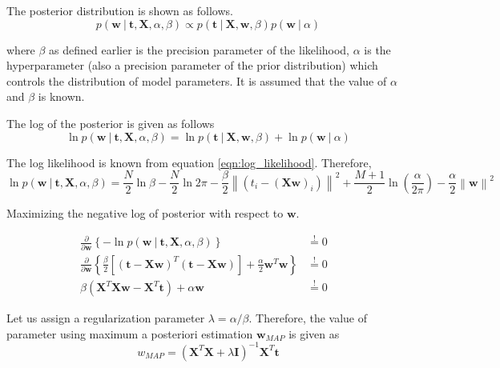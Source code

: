 \documentclass[11pt]{article}
\newcommand\given[1][]{\:#1\vert\:}
\newcommand{\norm}[1]{\left\lVert#1\right\rVert}
\begin{document}
The posterior distribution is shown as follows.
\begin{equation}
    p(\bm{w} \given \bm{t}, \bm{X}, \alpha, \beta) \propto p(\bm{t} \given \bm{X}, \bm{w}, \beta) p(\bm{w} \given \alpha)
\end{equation}

where $\beta$ as defined earlier is the precision parameter of the likelihood, $\alpha$ is the hyperparameter (also a precision parameter of the prior distribution) which controls the distribution of model parameters. It is assumed that the value of $\alpha$ and $\beta$ is known.

The log of the posterior is given as follows
\begin{equation}
    \ln{p(\bm{w} \given \bm{t}, \bm{X}, \alpha, \beta)} = 
    \ln{p(\bm{t} \given \bm{X}, \bm{w}, \beta)} + \ln{p(\bm{w} \given \alpha)}
\end{equation}

The log likelihood is known from equation \ref{eqn:log_likelihood}. Therefore, 
\begin{equation} \label{eqn:log_posterior}
    \ln{p(\bm{w} \given \bm{t}, \bm{X}, \alpha, \beta)} = \frac{N}{2}\ln{\beta} - \frac{N}{2}\ln{2\pi} - \frac{\beta}{2} \norm{\left(t_i - (\bm{X}\bm{w})_i\right)}^2 + \frac{M+1}{2} \ln{\left( \frac{\alpha}{2\pi} \right)} - \frac{\alpha}{2}\norm{\bm{w}}^2
\end{equation}

\newpage
Maximizing the negative log of posterior with respect to $\bm{w}$.

\begin{eqnarray}
    \frac{\partial }{\partial  \bm{w}} \left\{ -\ln{p(\bm{w} \given \bm{t}, \bm{X}, \alpha, \beta)} \right\} 
    &\overset{!}{=} 0& \\
    \frac{\partial }{\partial \bm{w}} \left\{\frac{\beta}{2} \left[ \left(\bm{t} - \bm{X}\bm{w}\right)^T \left(\bm{t} - \bm{X}\bm{w}\right)\right] + \frac{\alpha}{2}\bm{w}^T\bm{w}\right\}
    &\overset{!}{=} 0& \\
    \beta \left( \bm{X}^T\bm{X}\bm{w} - \bm{X}^T \bm{t} \right) + \alpha\bm{w}
    &\overset{!}{=} 0& 
\end{eqnarray}

Let us assign a regularization parameter $\lambda = \alpha/\beta$. Therefore, the value of parameter using maximum a posteriori estimation $\bm{w}_{MAP}$ is given as
\begin{equation} \label{eqn:w_map}
    w_{MAP} = \left(\bm{X}^T\bm{X} + \lambda\bm{I}\right)^{-1}\bm{X}^T\bm{t}
\end{equation}
\end{document}
